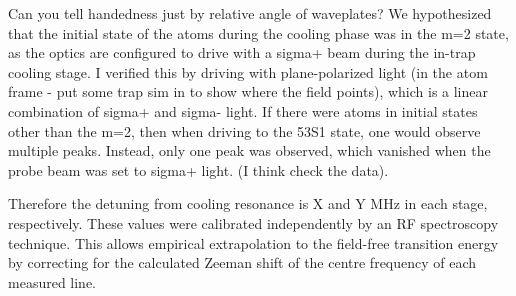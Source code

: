 	Can you tell handedness just by relative angle of waveplates? We hypothesized that the initial state of the atoms during the cooling phase was in the m=2 state, as the optics are configured to drive with a sigma+ beam during the in-trap cooling stage.
	I verified this by driving with plane-polarized light (in the atom frame - put some trap sim in to show where the field points), which is a linear combination of sigma+ and sigma- light.
	If there were atoms in initial states other than the m=2, then when driving to the 53S1 state, one would observe multiple peaks.
	Instead, only one peak was observed, which vanished when the probe beam was set to sigma+ light.
	(I think check the data).

	Therefore the detuning from cooling resonance is X and Y MHz in each stage, respectively.
	These values were calibrated independently by an RF spectroscopy technique.
	This allows empirical extrapolation to the field-free transition energy by correcting for the calculated Zeeman shift of the centre frequency of each measured line.



